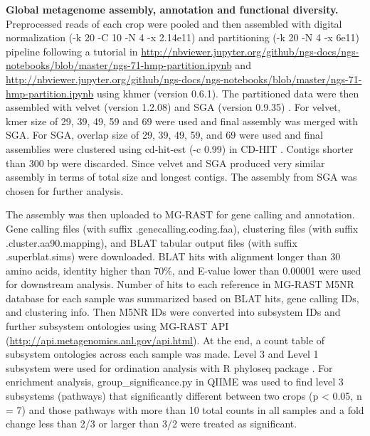 \documentclass[]{msu-thesis}
\begin{document}
\textbf{Global metagenome assembly, annotation and functional diversity. }
Preprocessed reads of each crop were pooled and then assembled with digital normalization (-k 20 -C 10 -N 4 -x 2.14e11) and partitioning (-k 20 -N 4 -x 6e11) pipeline \cite{howe_tackling_2014} following a tutorial in \url{http://nbviewer.jupyter.org/github/ngs-docs/ngs-notebooks/blob/master/ngs-71-hmp-partition.ipynb} and \url{http://nbviewer.jupyter.org/github/ngs-docs/ngs-notebooks/blob/master/ngs-71-hmp-partition.ipynb} using khmer (version 0.6.1). The partitioned data were then assembled with velvet (version 1.2.08) \cite{zerbino_velvet:_2008} and SGA (version 0.9.35) \cite{simpson_efficient_2012}. For velvet, kmer size of 29, 39, 49, 59 and 69 were used and final assembly was merged with SGA. For SGA, overlap size of 29, 39, 49, 59, and 69 were used and final assemblies were clustered using cd-hit-est (-c 0.99) in CD-HIT \cite{li_cd-hit:_2006}. Contigs shorter than 300 bp were discarded. Since velvet and SGA produced very similar assembly in terms of total size and longest contigs. The assembly from SGA was chosen for further analysis.

The assembly was then uploaded to MG-RAST \cite{meyer_metagenomics_2008} for gene calling and annotation. Gene calling files (with suffix .genecalling.coding.faa), clustering files (with suffix .cluster.aa90.mapping), and BLAT \cite{kent_blatblast-like_2002} tabular output files (with suffix .superblat.sims) were downloaded. BLAT hits with alignment longer than 30 amino acids, identity higher than 70\%, and E-value lower than 0.00001 were used for downstream analysis. Number of hits to each reference in MG-RAST M5NR database for each sample was summarized based on BLAT hits, gene calling IDs, and clustering info. Then M5NR IDs were converted into subsystem IDs and further subsystem ontologies using MG-RAST API (\url{http://api.metagenomics.anl.gov/api.html}). At the end, a count table of subsystem ontologies across each sample was made. Level 3 and Level 1 subsystem were used for ordination analysis with R phyloseq package \cite{mcmurdie_phyloseq:_2013}. For enrichment analysis, group\_significance.py in QIIME \cite{kuczynski_using_2012} was used to find level 3 subsystems (pathways) that significantly different between two crops (p < 0.05, n = 7) and those pathways with more than 10 total counts in all samples and a fold change less than 2/3 or larger than 3/2 were treated as significant.
\end{document}
